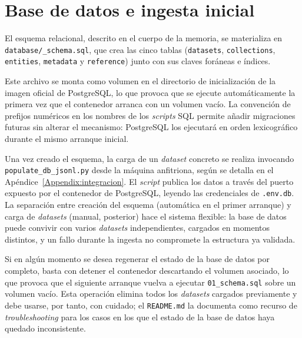 \FloatBarrier

\section{Base de datos e ingesta inicial}

\begin{sloppypar}
El esquema relacional, descrito en el cuerpo de la memoria, se
materializa en \texttt{database/\_\allowbreak schema.sql}, que crea las
cinco tablas (\texttt{datasets}, \texttt{collections}, \texttt{entities},
\texttt{metadata} y \texttt{reference}) junto con sus claves foráneas e índices.
\end{sloppypar} Este archivo se monta como volumen en el directorio de
inicialización de la imagen oficial de PostgreSQL, lo que provoca que se
ejecute automáticamente la primera vez que el contenedor arranca con un
volumen vacío. La convención de prefijos numéricos en los nombres de
los \textit{scripts} SQL permite añadir migraciones futuras sin alterar el
mecanismo: PostgreSQL los ejecutará en orden lexicográfico durante el
mismo arranque inicial.

Una vez creado el esquema, la carga de un \textit{dataset} concreto se realiza
invocando \texttt{populate\_db\_jsonl.py} desde la máquina anfitriona,
según se detalla en el Apéndice~\ref{Appendix:integracion}. El \textit{script}
publica los datos a través del puerto expuesto por el contenedor de
PostgreSQL, leyendo las credenciales de \texttt{.env.db}. La separación
entre creación del esquema (automática en el primer arranque) y carga
de \textit{datasets} (manual, posterior) hace el sistema flexible: la base de
datos puede convivir con varios \textit{datasets} independientes, cargados en
momentos distintos, y un fallo durante la ingesta no compromete la
estructura ya validada.

Si en algún momento se desea regenerar el estado de la base de datos
por completo, basta con detener el contenedor descartando el volumen
asociado, lo que provoca que el siguiente arranque vuelva a ejecutar
\texttt{01\_schema.sql} sobre un volumen vacío. Esta operación elimina
todos los \textit{datasets} cargados previamente y debe usarse, por tanto, con
cuidado; el \texttt{README.md} la documenta como recurso de
\emph{troubleshooting} para los casos en los que el estado de la base
de datos haya quedado inconsistente.
